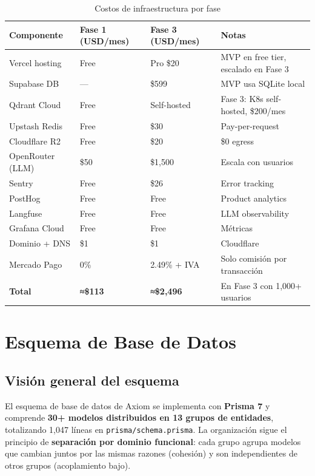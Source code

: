 \documentclass[10pt,a4paper,oneside]{report}
\begin{document}
\begin{table}[H]
\centering
\begin{tabular}{p{2.8cm}p{2.5cm}p{2.5cm}p{5.5cm}}
\toprule
\textbf{Componente} & \textbf{Fase 1 (USD/mes)} & \textbf{Fase 3 (USD/mes)} & \textbf{Notas} \\
\midrule
Vercel hosting & Free & Pro \$20 & MVP en free tier, escalado en Fase 3 \\
Supabase DB & --- & \$599 & MVP usa SQLite local \\
Qdrant Cloud & Free & Self-hosted & Fase 3: K8s self-hosted, \$200/mes \\
Upstash Redis & Free & \$30 & Pay-per-request \\
Cloudflare R2 & Free & \$20 & \$0 egress \\
OpenRouter (LLM) & \$50 & \$1,500 & Escala con usuarios \\
Sentry & Free & \$26 & Error tracking \\
PostHog & Free & Free & Product analytics \\
Langfuse & Free & Free & LLM observability \\
Grafana Cloud & Free & Free & Métricas \\
Dominio + DNS & \$1 & \$1 & Cloudflare \\
Mercado Pago & 0\% & 2.49\% + IVA & Solo comisión por transacción \\
\midrule
\textbf{Total} & \textbf{≈\$113} & \textbf{≈\$2,496} & En Fase 3 con 1,000+ usuarios \\
\bottomrule
\end{tabular}
\caption{Costos de infraestructura por fase}
\end{table}

\chapter{Esquema de Base de Datos}

\section{Visión general del esquema}
El esquema de base de datos de Axiom se implementa con \textbf{Prisma 7} y comprende \textbf{30+ modelos distribuidos en 13 grupos de entidades}, totalizando 1,047 líneas en \texttt{prisma/schema.prisma}. La organización sigue el principio de \textbf{separación por dominio funcional}: cada grupo agrupa modelos que cambian juntos por las mismas razones (cohesión) y son independientes de otros grupos (acoplamiento bajo).
\end{document}
